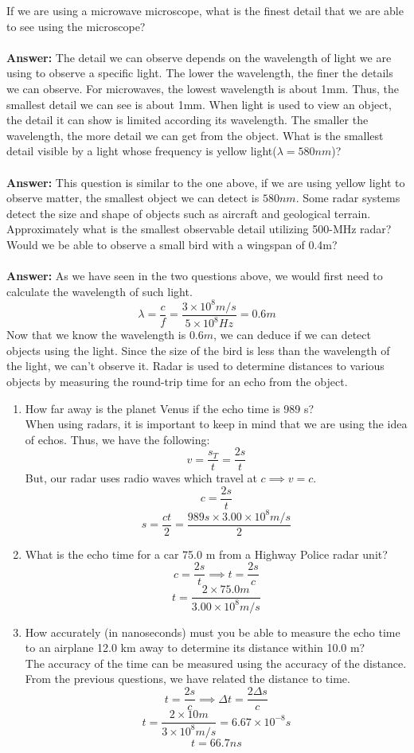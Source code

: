 \documentclass[11pt,addpoints]{exam}
\begin{document}
	\begin{questions}
		\question If we are using a microwave microscope, what is the finest detail that we are able to see using the microscope?
		\\ \\ 
		\textbf{Answer:} The detail we can observe depends on the wavelength of light we are using to observe a specific light. The lower the wavelength, the finer the details we can observe. For microwaves, the lowest wavelength is about 1mm. Thus, the smallest detail we can see is about 1mm.
		\question When light is used to view an object, the detail it can show is limited according its wavelength. The smaller the wavelength, the more detail we can get from the object. What is the smallest detail visible by a light whose frequency is yellow light($\lambda=580nm$)? 
		\\ \\ 
		\textbf{Answer:} This question is similar to the one above, if we are using yellow light to observe matter, the smallest object we can detect is $580nm$.
		\question Some radar systems detect the size and shape of objects such as aircraft and geological terrain. Approximately what is the smallest observable detail utilizing 500-MHz radar? Would we be able to observe a small bird with a wingspan of 0.4m?
		\\ \\ 
		\textbf{Answer:} As we have seen in the two questions above, we would first need to calculate the wavelength of such light.
		$$\lambda=\dfrac{c}{f}=\dfrac{3\times10^{8}m/s}{5\times10^{8}Hz}=0.6m$$
		Now that we know the wavelength is $0.6m$, we can deduce if we can detect objects using the light. Since the size of the bird is less than the wavelength of the light, we can't observe it.
		\question Radar is used to determine distances to various objects by measuring the round-trip time for an echo from the object.
		\begin{enumerate}[label=(\alph*)]
			\item How far away is the planet Venus if the echo time is 989 s? \\
			When using radars, it is important to keep in mind that we are using the idea of echos. Thus, we have the following:
			$$v=\dfrac{s_T}{t}=\dfrac{2s}{t}$$
			But, our radar uses radio waves which travel at $c\implies v=c$.
			$$c=\dfrac{2s}{t}$$
			$$s=\dfrac{ct}{2}=\dfrac{989s\times3.00\times10^8m/s}{2}$$
			\item What is the echo time for a car 75.0 m from a Highway Police radar unit?
			$$c=\dfrac{2s}{t}\implies t=\dfrac{2s}{c}$$
			$$t=\dfrac{2\times75.0m}{3.00\times10^8m/s}$$
			\item How accurately (in nanoseconds) must you be able to measure the echo time to an airplane 12.0 km away to determine its distance within 10.0 m? \\
			The accuracy of the time can be measured using the accuracy of the distance. From the previous questions, we have related the distance to time.
			$$t=\dfrac{2s}{c}\implies \Delta t=\dfrac{2\Delta s}{c}$$
			$$t=\dfrac{2\times10m}{3\times10^8m/s}=6.67\times10^{-8}s$$
			$$t=66.7ns$$
		\end{enumerate}

\end{questions}
\end{document}
